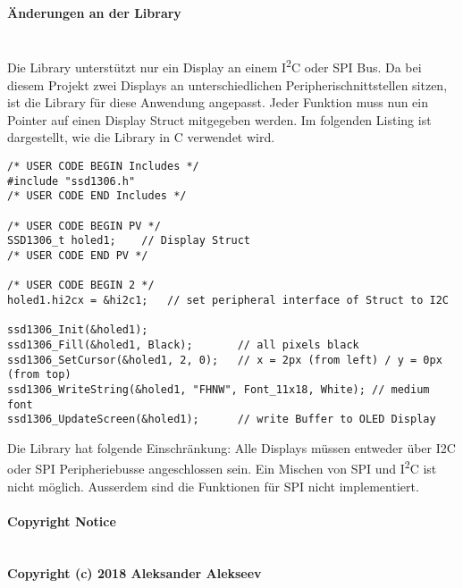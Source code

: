 \paragraph{Änderungen an der Library}\vspace{-0.3cm}\\
Die Library unterstützt nur ein Display an einem I\textsuperscript{2}C oder SPI Bus. Da bei diesem Projekt zwei Displays an unterschiedlichen Peripherischnittstellen sitzen, ist die Library für diese Anwendung angepasst.
Jeder Funktion muss nun ein Pointer auf einen Display Struct mitgegeben werden.
Im folgenden Listing ist dargestellt, wie die Library in C verwendet wird.\\
\newpage
\begin{lstlisting}[style=Cuvision, caption={Initialisierung und Anwendung der SSD1306 Library}]
/* USER CODE BEGIN Includes */
#include "ssd1306.h"
/* USER CODE END Includes */

/* USER CODE BEGIN PV */
SSD1306_t holed1;    // Display Struct
/* USER CODE END PV */

/* USER CODE BEGIN 2 */
holed1.hi2cx = &hi2c1;   // set peripheral interface of Struct to I2C

ssd1306_Init(&holed1);
ssd1306_Fill(&holed1, Black);       // all pixels black
ssd1306_SetCursor(&holed1, 2, 0);   // x = 2px (from left) / y = 0px (from top)
ssd1306_WriteString(&holed1, "FHNW", Font_11x18, White); // medium font
ssd1306_UpdateScreen(&holed1);      // write Buffer to OLED Display
\end{lstlisting}

Die Library hat folgende Einschränkung: Alle Displays müssen entweder über I2C oder SPI Peripheriebusse angeschlossen sein.
Ein Mischen von SPI und I\textsuperscript{2}C ist nicht möglich. Ausserdem sind die Funktionen für SPI nicht implementiert.
\\
\paragraph{Copyright Notice}\vspace{-0.3cm}\\
\textbf{Copyright (c) 2018 Aleksander Alekseev}\
\
\
